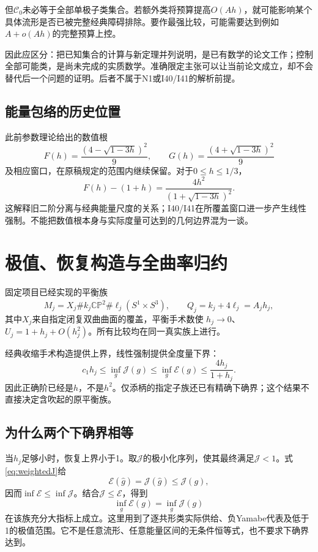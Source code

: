 \documentclass[UTF8,fontset=fandol,zihao=-4,a4paper]{ctexart}
\theoremstyle{remark}
\newcommand{\E}{\mathcal E}
\newcommand{\J}{\mathcal J}
\begin{document}
但$\mathcal C_0$未必等于全部单极子类集合。若额外类将预算提高$O(Ah)$，就可能影响某个具体流形是否已被完整经典障碍排除。要作最强比较，可能需要达到例如$A+o(Ah)$的完整预算上控。

因此应区分：把已知集合的计算与新定理并列说明，是已有数学的论文工作；控制全部可能类，是尚未完成的实质数学。准确限定主张可以让当前论文成立，却不会替代后一个问题的证明。后者不属于N1或I40/I41的解析前提。

\subsection{能量包络的历史位置}

此前参数理论给出的数值根
\[
F(h)=\frac{(4-\sqrt{1-3h})^2}{9},\qquad
G(h)=\frac{(4+\sqrt{1-3h})^2}{9}
\]
及相应窗口，在原稿规定的范围内继续保留。对于$0\le h\le1/3$，
\[
F(h)-(1+h)=\frac{4h^2}{(1+\sqrt{1-3h})^2}.
\]
这解释旧二阶分离与经典能量尺度的关系；I40/I41在所覆盖窗口进一步产生线性强制。不能把数值根本身与实际度量可达到的几何边界混为一谈。

\section{极值、恢复构造与全曲率归约}
\label{sec:variational}

固定项目已经实现的平衡族
\begin{equation}
M_j=X_j\#k_j\overline{\mathbb{CP}^{2}}
\#\ell_j(S^1\times S^3),\qquad
Q_j=k_j+4\ell_j=A_jh_j,
\label{eq:family}
\end{equation}
其中$X_j$来自指定闭复双曲曲面的覆盖，平衡手术数使
$h_j\to0$、$U_j=1+h_j+O(h_j^2)$。所有比较均在同一真实族上进行。

经典收缩手术构造提供上界，线性强制提供全度量下界：
\begin{equation}
c_1h_j\le\inf_g\J(g)\le\inf_g\E(g)
\le\frac{4h_j}{1+h_j}.
\label{eq:order}
\end{equation}
因此正确阶已经是$h$，不是$h^2$。仅添柄的指定子族还已有精确下确界；这个结果不直接决定含吹起的原平衡族。

\subsection{为什么两个下确界相等}

当$h_j$足够小时，恢复上界小于1。取$\J$的极小化序列，使其最终满足$\J<1$。式\eqref{eq:weightedJ}给
\[
\E(\widehat g)=\J(\widehat g)\le\J(g),
\]
因而$\inf\E\le\inf\J$。结合$\J\le\E$，得到
\begin{equation}
\boxed{\inf_g\E(g)=\inf_g\J(g)}
\label{eq:infequal}
\end{equation}
在该族充分大指标上成立。这里用到了逐共形类实际供给、负Yamabe代表及低于1的极值范围。它不是任意流形、任意能量区间的无条件恒等式，也不要求下确界达到。
\end{document}
